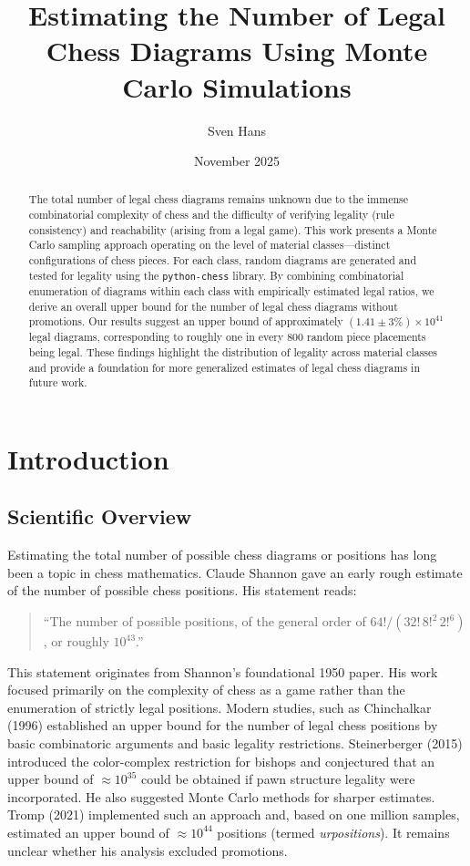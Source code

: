 \documentclass[12pt]{article}
\title{Estimating the Number of Legal Chess Diagrams Using Monte Carlo Simulations}
\author{Sven Hans}
\date{November 2025}
\begin{document}
\maketitle

\begin{abstract}
The total number of legal chess diagrams remains unknown due to the immense
combinatorial complexity of chess and the difficulty of verifying legality (rule consistency) and reachability (arising from a legal game). 
This work presents a Monte Carlo sampling approach operating on the level of material classes---distinct configurations of chess pieces. For each class, random 
diagrams are generated and tested for legality using the \texttt{python-chess} library. 
By combining combinatorial enumeration of diagrams within each class with empirically 
estimated legal ratios, we derive an overall upper bound for the number of legal chess diagrams 
without promotions. Our results suggest an upper bound of approximately 
$(1.41\pm 3\%)\times10^{41}$ legal diagrams, corresponding to roughly one in every 
800 random piece placements being legal. These findings highlight the distribution 
of legality across material classes and provide a foundation for more generalized estimates 
of legal chess diagrams in future work.
\end{abstract}

\section{Introduction}

\subsection{Scientific Overview}

Estimating the total number of possible chess diagrams or positions has long been a topic in chess mathematics. Claude Shannon \cite{shannon1950} gave an early rough estimate of the number of possible chess positions. His statement reads:

\begin{quote}
``The number of possible positions, of the general order of 
$64! / (32! \, 8!^2 \, 2!^6)$, or roughly $10^{43}$.''
\end{quote}

This statement originates from Shannon’s foundational 1950 paper. His work focused primarily on the complexity of chess as a game rather than the enumeration of strictly legal positions. 
Modern studies, such as Chinchalkar (1996) \cite{chinchalkar1996} established an upper bound for the number of legal chess positions by basic combinatoric arguments and basic legality restrictions. Steinerberger (2015) \cite{steinerberger2015} 
introduced the color-complex restriction for bishops and conjectured that an 
upper bound of $\approx 10^{35}$ could be obtained if pawn structure legality were 
incorporated. He also suggested Monte Carlo methods for sharper estimates. 
Tromp (2021) \cite{tromp2021b} implemented such an approach and, based on one 
million samples, estimated an upper bound of $\approx 10^{44}$ positions (termed 
\emph{urpositions}). It remains unclear whether his analysis excluded promotions.
\end{document}
